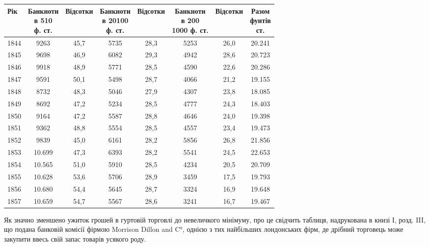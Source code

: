 
\begin{table}[h]
  \small
  \begin{tabular}{l c c c c c c c}
  \toprule
Рік  &  \makecell{Банкноти\\ в 5\textendash{}10 \\ф. ст.} & Відсотки  &
\makecell{Банкноти\\ в 20\textendash{}100\\ ф. ст.} & Відсотки  &  \makecell{Банкноти\\ в 200\textendash{}\\1000
ф. ст.} & Відсотки &   \makecell{Разом\\  фунтів \\ ст.} \\
  \midrule
1844    &     \phantom{0}9263  &  45,7  &  5735 & 28,3 & 5253 &   26,0 &   \num{20.241}\\
1845    &     \phantom{0}9698  &  46,9  &  6082 & 29,3 & 4942 &   28,6 &   \num{20.723}\\
1846    &     \phantom{0}9918  &  48,9  &  5771 & 28,5 & 4590 &   22,6 &   \num{20.286}\\
1847    &     \phantom{0}9591  &  50,1  &  5498 & 28,7 & 4066 &   21,2 &   \num{19.155}\\
1848    &     \phantom{0}8732  &  48,3  &  5046 & 27,9 & 4307 &   23,8 &   \num{18.085}\\
1849    &     \phantom{0}8692  &  47,2  &  5234 & 28,5 & 4777 &   24,3 &   \num{18.403}\\
1850    &     \phantom{0}9164  &  47,2  &  5587 & 28,8 & 4646 &   24,0 &   \num{19.398}\\
1851    &     \phantom{0}9362  &  48,8  &  5554 & 28,5 & 4557 &   23,4 &   \num{19.473}\\
1852    &     \phantom{0}9839  &  45,0  &  6161 & 28,2 & 5856 &   26,8 &   \num{21.856}\\
1853    &     \num{10.699} &  47,3  &  6393 & 28,2 & 5541 &   24,5 &   \num{22.653}\\
1854    &     \num{10.565} &  51,0  &  5910 & 28,5 & 4234 &   20,5 &   \num{20.709}\\
1855    &     \num{10.628} &  53,6  &  5706 & 28,9 & 3459 &   17,5 &   \num{19.793}\\
1856    &     \num{10.680} &  54,4  &  5645 & 28,7 & 3324 &   16,9 &   \num{19.648}\\
1857    &     \num{10.659} &  54,7  &  5567 & 28,6 & 3241 &   16,7 &   \num{19.467}\\
\end{tabular}
\end{table}
Як значно зменшено ужиток грошей в гуртовій торговлі до невеличкого
мінімуму, про це свідчить таблиця, надрукована в книзі І, розд. III,
що подана банковій комісії фірмою Morrison Dillon and C°, однією з тих найбільших
лондонських фірм, де дрібний торговець може закупити ввесь свій запас
товарів усякого роду.

